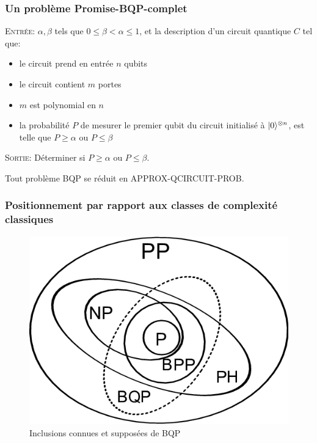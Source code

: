 \documentclass[aspectratio=169]{beamer}
\theoremstyle{plain}
\theoremstyle{definition}
\DeclarePairedDelimiter\ket{\lvert}{\rangle}
\begin{document}
\begin{frame}
    \frametitle{Un problème Promise-BQP-complet}
    \begin{definition}
        \textsc{Entrée}: $\alpha, \beta$ tels que $0\leq\beta<\alpha\leq 1$, et la description d'un circuit quantique $C$ tel que:
        \begin{itemize}[label=--, noitemsep]
            \item le circuit prend en entrée $n$ qubits
            \item le circuit contient $m$ portes
            \item $m$ est polynomial en $n$
            \item la probabilité $P$ de mesurer le premier qubit du circuit initialisé à $\ket{0}^{\otimes n}$, est telle que $P\geq\alpha$ ou $P\leq\beta$
        \end{itemize}
        \textsc{Sortie}: Déterminer si $P\geq\alpha$ ou $P\leq\beta$.
    \end{definition}

    \begin{theorem}[Complétude]
        Tout problème BQP se réduit en APPROX-QCIRCUIT-PROB.
    \end{theorem}
\end{frame}

\begin{frame}
    \frametitle{Positionnement par rapport aux classes de complexité classiques}
    \begin{figure}[!ht]
        \centering
        \includegraphics[scale=0.35]{bqp-inclusions.png}
        \caption{Inclusions connues et supposées de BQP}
    \end{figure}
\end{frame}
\end{document}
